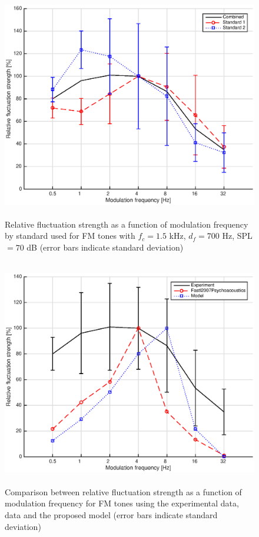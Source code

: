 \documentclass[a4paper]{article}
\begin{document}
\begin{figure}[ht]
    \centering
    \includegraphics[height=10cm]{img/FM_tones-fm-results-All-standards}
    \caption{Relative fluctuation strength as a function of modulation
        frequency by standard used for FM tones with $f_c = 1.5$ kHz,
        $d_f = 700$ Hz, SPL $= 70$ dB (error bars indicate standard deviation)}
    \label{fig:fmstds}
\end{figure}

\begin{figure}[ht]
    \centering
    \includegraphics[height=10cm]{img/FM_tones-fm-results-All-comparison}
    \caption{Comparison between relative fluctuation strength as a function of
        modulation frequency for FM tones using the experimental data,
        \citeauthor{Fastl2007Psychoacoustics} data and the proposed model
        (error bars indicate standard deviation)}
    \label{fig:fmcomp}
\end{figure}

\custombibliography
\end{document}
